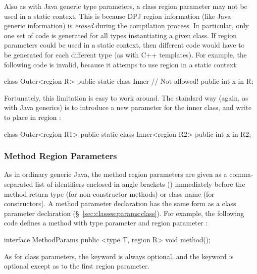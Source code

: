 Also as with Java generic type parameters, a class region parameter
may not be used in a static context.  This is because DPJ region
information (like Java generic information) is \emph{erased} during
the compilation process.  In particular, only one set of code is
generated for all types instantiating a given class.  If region
parameters could be used in a static context, then different code
would have to be generated for each different type (as with C++
templates).
%
For example, the following code is invalid, because it attemps to use
region  in a static context:
%
\begin{dpjlisting}
class Outer<region R> {
  public static class Inner {
    // Not allowed!
    public int x in R;
  }
}
\end{dpjlisting}

Fortunately, this limitation is easy to work around.  The standard way
(again, as with Java generics) is to introduce a new parameter for the
inner class, and write  to place  in region
:

\begin{dpjlisting}
class Outer<region R1> {
  public static class Inner<region R2> {
    public int x in R2;
  }
}
\end{dpjlisting}


\subsubsection{Method Region Parameters%
\label{sec:classes:params:method}}

 As in ordinary generic
Java, the method region parameters are given as a comma-separated list
of identifiers enclosed in angle brackets (\kwd{<>}) immediately
before the method return type (for non-constructor methods) or class
name (for constructors).  A method parameter declaration has the same
form as a class parameter declaration
(\S~\ref{sec:classes:params:class}).
%
For example, the following code defines a method with type parameter
 and region parameter :
%
\begin{dpjlisting}
interface MethodParams {
  public <type T, region R> void method();
}
\end{dpjlisting}
%
As for class parameters, the  keyword is always optional,
and the  keyword is optional except as to the first region
parameter.


